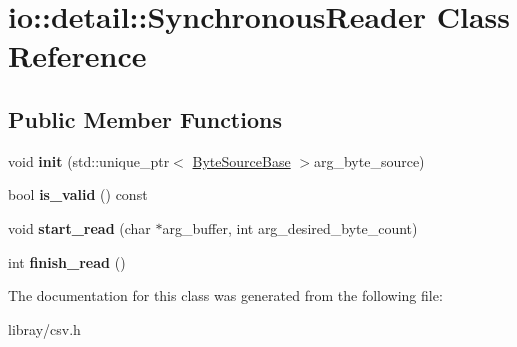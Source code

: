 \hypertarget{classio_1_1detail_1_1SynchronousReader}{}\section{io\+:\+:detail\+:\+:Synchronous\+Reader Class Reference}
\label{classio_1_1detail_1_1SynchronousReader}
\subsection*{Public Member Functions}
\begin{DoxyCompactItemize}
\item 
\mbox{\label{classio_1_1detail_1_1SynchronousReader_a4dc78563ff667b92ad3096a94e834eb5}} 
void {\bfseries init} (std\+::unique\+\_\+ptr$<$ \hyperlink{classio_1_1ByteSourceBase}{Byte\+Source\+Base} $>$arg\+\_\+byte\+\_\+source)
\item 
\mbox{\label{classio_1_1detail_1_1SynchronousReader_a9d6b2c888cc7020df1bb81c8bb5c58bc}} 
bool {\bfseries is\+\_\+valid} () const
\item 
\mbox{\label{classio_1_1detail_1_1SynchronousReader_a6cad1371b97e14f660914898b16433c4}} 
void {\bfseries start\+\_\+read} (char $\ast$arg\+\_\+buffer, int arg\+\_\+desired\+\_\+byte\+\_\+count)
\item 
\mbox{\label{classio_1_1detail_1_1SynchronousReader_a519a0cb25c641d2e51b6542749c44606}} 
int {\bfseries finish\+\_\+read} ()
\end{DoxyCompactItemize}


The documentation for this class was generated from the following file\+:\begin{DoxyCompactItemize}
\item 
libray/csv.\+h\end{DoxyCompactItemize}
